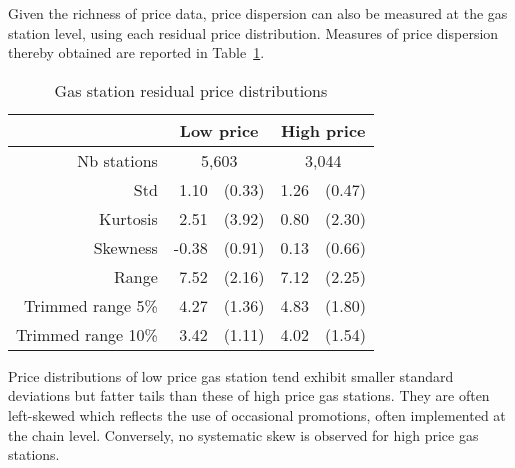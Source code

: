 \documentclass[english]{article}
\begin{document}
Given the richness of price data, price dispersion can also be measured at the gas station level, using each residual price distribution. Measures of price dispersion thereby obtained are reported in Table~\ref{tab:station_price_support_stats_des}.

\begin{table}[H]
  \caption{Gas station residual price distributions}
	\label{tab:station_price_support_stats_des}
\begin{tabular}{rrrrr}
\hline
\hline
      & \multicolumn{2}{c}{Low price} & \multicolumn{2}{c}{High price} \\
\hline
Nb stations & \multicolumn{2}{c}{5,603} & \multicolumn{2}{c}{3,044} \\
Std   & 1.10  & (0.33) & 1.26  & (0.47) \\
Kurtosis & 2.51  & (3.92) & 0.80  & (2.30) \\
Skewness & -0.38 & (0.91) & 0.13  & (0.66) \\
Range & 7.52  & (2.16) & 7.12  & (2.25) \\
Trimmed range 5\% & 4.27  & (1.36) & 4.83  & (1.80) \\
Trimmed range 10\% & 3.42  & (1.11) & 4.02  & (1.54) \\
\hline
\hline
\end{tabular}
\end{table}

Price distributions of low price gas station tend exhibit smaller standard deviations but fatter tails than these of high price gas stations. They are often left-skewed which reflects the use of occasional promotions, often implemented at the chain level. Conversely, no systematic skew is observed for high price gas stations.
\end{document}
